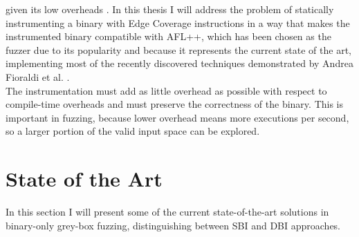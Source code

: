     given its low overheads \cite{zafl}.
    In this thesis I will address the problem
    of statically instrumenting a binary with Edge Coverage instructions in a way that makes the instrumented binary compatible with AFL++,
    which has been chosen as the fuzzer due to its popularity and because it represents the current state of the art, implementing
    most of the recently discovered techniques demonstrated by Andrea Fioraldi et al. \cite{aflplusplus}.\\
    The instrumentation must add as little overhead as possible with respect to compile-time overheads and must
    preserve the correctness of the binary. This is important in fuzzing, because lower overhead means more executions per second,
    so a larger portion of the valid input space can be explored.

    \section{State of the Art}\label{sec:state_of_the_art}
        In this section I will present some of the current state-of-the-art solutions in binary-only grey-box fuzzing,
        distinguishing between \gls{SBI} and \gls{DBI} approaches.

